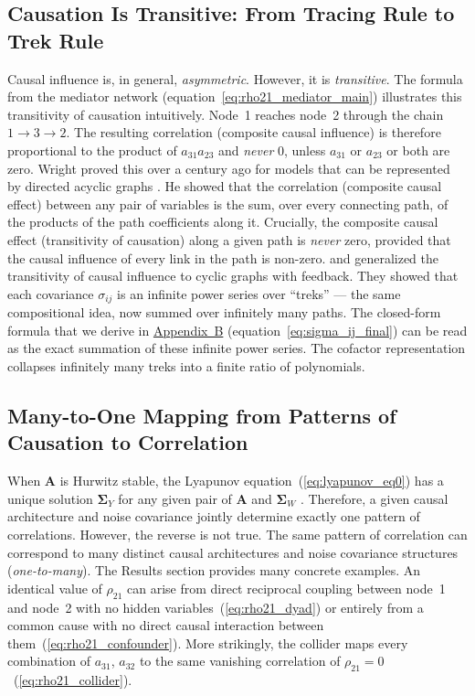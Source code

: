\documentclass[12pt]{article}
\begin{document}
\subsection*{Causation Is Transitive: From Tracing Rule to
             Trek Rule}

Causal influence is, in general, \emph{asymmetric}.
However, it is \emph{transitive}. The formula from the mediator network (equation~\ref{eq:rho21_mediator_main}) illustrates this transitivity of causation intuitively. Node~1
reaches node~2 through the chain $1\to3\to2$.
The resulting correlation (composite causal influence) is therefore proportional to the
product of $a_{31}a_{23}$ and \emph{never} 0, unless $a_{31}$ or $a_{23}$ or both are zero. Wright proved this over a century ago for models that can be represented by directed acyclic graphs \citep{Wright1921}. He showed that the correlation (composite causal effect) between any pair of variables is the sum, over every connecting path, of the
products of the path coefficients along it. Crucially, the composite causal effect (transitivity of causation) along a given path is \emph{never} zero, provided that the causal influence of every link in the path is non-zero. \citet{VarandoHansen2020} and \citet{HansenTrek2025} generalized the transitivity of causal influence to cyclic graphs with feedback. They showed that each covariance $\sigma_{ij}$ is an infinite power series over ``treks'' --- the same
compositional idea, now summed over infinitely many paths.
The closed-form formula that we derive in
\hyperref[app:appB]{Appendix~B} (equation~\ref{eq:sigma_ij_final}) can be read
as the exact summation of these infinite power series. The cofactor
representation collapses infinitely many treks into a finite
ratio of polynomials. 


\subsection*{Many-to-One Mapping from Patterns of Causation
             to Correlation}

When $\mathbf{A}$ is Hurwitz stable,
the Lyapunov equation~(\ref{eq:lyapunov_eq0}) has a unique
solution $\mathbf{\Sigma}_Y$ for any given pair of
$\mathbf{A}$ and $\mathbf{\Sigma}_W$
\citep{Antsaklis1997, Hespanha2018}. Therefore, a given causal architecture
and noise covariance jointly determine exactly one pattern
of correlations. However, the reverse is not true. The same pattern of correlation can correspond to many distinct causal architectures and noise covariance structures (\emph{one-to-many}). The Results section provides many concrete examples. An identical value of $\rho_{21}$ can arise from direct
reciprocal coupling between node~1 and node~2 with no hidden
variables~(\ref{eq:rho21_dyad}) or entirely from a common cause with no direct causal interaction between them~(\ref{eq:rho21_confounder}). More strikingly, the collider maps every combination of $a_{31}$, $a_{32}$ to the same vanishing
correlation of $\rho_{21}=0$~(\ref{eq:rho21_collider}).
\end{document}
